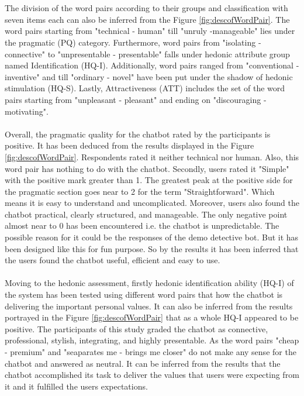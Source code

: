 \\~\\
The division of the word pairs according to their groups and classification with seven items each can also be inferred from the Figure \ref{fig:descofWordPair}. The word pairs starting from "technical - human" till "unruly -manageable" lies under the pragmatic (PQ) category. Furthermore, word pairs from "isolating - connective" to "unpresentable - presentable" falls under hedonic attribute group named Identification (HQ-I). Additionally, word pairs ranged from "conventional - inventive" and till "ordinary - novel" have been put under the shadow of hedonic stimulation (HQ-S). Lastly, Attractiveness (ATT) includes the set of the word pairs starting from "unpleasant - pleasant" and ending on "discouraging - motivating". 
\\~\\
Overall, the pragmatic quality for the chatbot rated by the participants is positive. It has been deduced from the results displayed in the Figure \ref{fig:descofWordPair}. Respondents rated it neither technical nor human. Also, this word pair has nothing to do with the chatbot. Secondly, users rated it "Simple" with the positive mark greater than 1. The greatest peak at the positive side for the pragmatic section goes near to 2 for the term "Straightforward". Which means it is easy to understand and uncomplicated. Moreover, users also found the chatbot practical, clearly structured, and manageable. The only negative point almost near to 0 has been encountered i.e. the chatbot is unpredictable. The possible reason for it could be the responses of the demo detective bot. But it has been designed like this for fun purpose. So by the results it has been inferred that the users found the chatbot useful, efficient and easy to use.
\\~\\
Moving to the hedonic assessment, firstly hedonic identification ability (HQ-I) of the system has been tested using different word pairs that how the chatbot is delivering the important personal values. It can also be inferred from the results portrayed in the Figure \ref{fig:descofWordPair} that as a whole HQ-I appeared to be positive. The participants of this study graded the chatbot as connective, professional, stylish, integrating, and highly presentable. As the word pairs "cheap - premium" and "seaparates me - brings me closer" do not make any sense for the chatbot and answered as neutral. It can be inferred from the results that the chatbot accomplished its task to deliver the values that users were expecting from it and it fulfilled the users expectations. 
